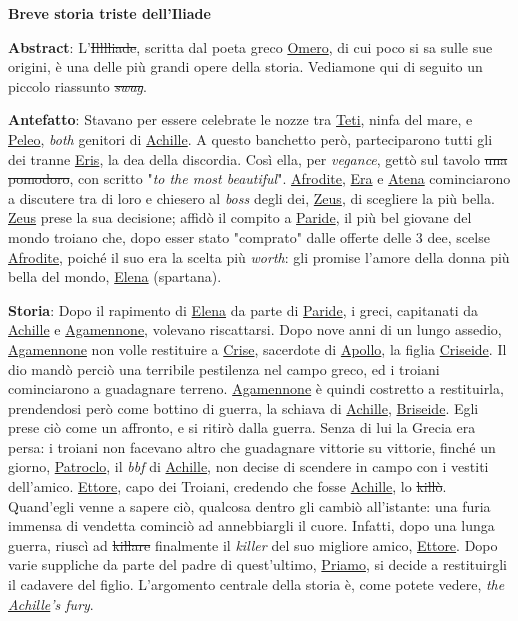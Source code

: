 \documentclass{article}
\begin{document}
\textbf{Breve storia triste dell’Iliade}

\textbf{Abstract}:
L'\sout{Illlliade}, scritta dal poeta greco \underline{Omero}, di cui poco si
sa sulle sue origini, è una delle più grandi opere della storia. Vediamone qui
di seguito un piccolo riassunto \sout{\textit{swag}}.

\textbf{Antefatto}:
Stavano per essere celebrate le nozze tra \underline{Teti}, ninfa del mare, e 
\underline{Peleo}, 
\textit{both} genitori di \underline{Achille}. A questo banchetto però,
parteciparono tutti gli dei tranne \underline{Eris}, la dea della discordia.
Così ella, per \textit{vegance}, gettò sul tavolo \sout{una pomodoro}, con
scritto "\textit{to the most beautiful}". \underline{Afrodite}, \underline{Era}
e \underline{Atena} cominciarono a discutere tra di loro e chiesero al 
\textit{boss} degli dei, \underline{Zeus}, di scegliere la più bella.
\underline{Zeus} prese la sua decisione; affidò il compito a 
\underline{Paride}, il più bel giovane del mondo troiano che, dopo esser stato
"comprato" dalle offerte delle 3 dee, scelse \underline{Afrodite}, poiché il
suo era la scelta più \textit{worth}: gli promise l'amore della donna più bella
del mondo, \underline{Elena} (spartana).

\textbf{Storia}:
Dopo il rapimento di \underline{Elena} da parte di \underline{Paride}, i greci,
capitanati da \underline{Achille} e \underline{Agamennone}, volevano
riscattarsi. Dopo nove anni di un lungo assedio, \underline{Agamennone} non
volle restituire a \underline{Crise}, sacerdote di \underline{Apollo}, la figlia
\underline{Criseide}. Il dio mandò perciò una terribile pestilenza nel campo
greco, ed i troiani cominciarono a guadagnare terreno. \underline{Agamennone} è
quindi costretto a restituirla, prendendosi però come bottino di guerra, la
schiava di \underline{Achille},
\underline{Briseide}. Egli prese ciò come un affronto, e si ritirò dalla
guerra. Senza di lui la Grecia era persa: i troiani non facevano altro che
guadagnare vittorie su vittorie, finché un giorno, \underline{Patroclo}, il 
\textit{bbf} di \underline{Achille}, non decise di scendere in campo con i
vestiti dell'amico. \underline{Ettore}, capo dei Troiani, credendo che fosse 
\underline{Achille}, lo \sout{killò}. Quand'egli venne a sapere ciò, qualcosa
dentro gli cambiò all'istante: una furia immensa di vendetta cominciò ad
annebbiargli il cuore. Infatti, dopo una lunga guerra, riuscì ad \sout{killare}
finalmente il \textit{killer} del suo migliore amico, \underline{Ettore}. Dopo
varie suppliche da parte del padre di quest'ultimo, \underline{Priamo}, si
decide a restituirgli il cadavere del figlio. L'argomento centrale della storia
è, come potete vedere, \textit{the \underline{Achille}'s fury}.
\end{document}
